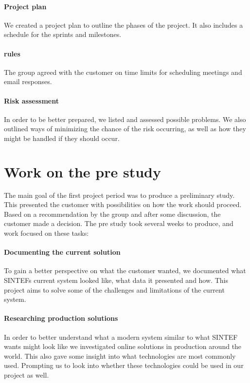 \documentclass[11pt,a4paper,titlepage,oneside]{report}
\begin{document}
\paragraph{Project plan}
We created a project plan to outline the phases of the project. It also includes a schedule for the sprints and milestones.
	
\paragraph{ rules}
The group agreed with the customer on time limits for scheduling meetings and email responses.

\paragraph{Risk assessment}
In order to be better prepared, we listed and assessed possible problems. We also outlined ways of minimizing the chance of the risk occurring, as well as how they might be handled if they should occur.

\section{Work on the pre study}
The main goal of the first project period was to produce a preliminary study. This presented the customer with possibilities on how the work should proceed. Based on a recommendation by the group and after some discussion, the customer made a decision. The pre study took several weeks to produce, and work focused on these tasks:

\paragraph{Documenting the current solution}
To gain a better perspective on what the customer wanted, we documented what SINTEFs current system looked like, what data it presented and how. This project aims to solve some of the challenges and limitations of the current system.

\paragraph{Researching production solutions}
In order to better understand what a modern system similar to what SINTEF wants might look like we investigated online solutions in production around the world. This also gave some insight into what technologies are most commonly used. Prompting us to look into whether these technologies could be used in our project as well.
\end{document}
